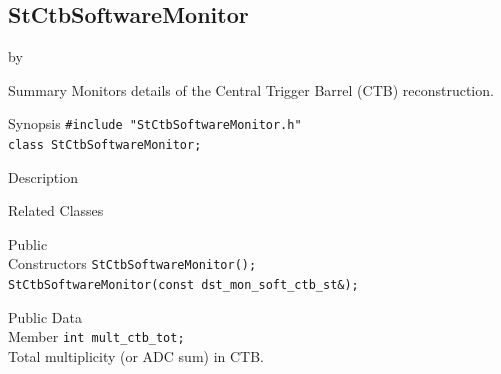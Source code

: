 \documentclass[twoside]{article}
\newcommand{\entrylabel}[1]{\mbox{\textbf{{#1}}}\hfil}%
\newenvironment{entry}
{\begin{list}{}%
    {\renewcommand{\makelabel}{\entrylabel}%
     \setlength{\labelwidth}{90pt}%
     \setlength{\leftmargin}{\labelwidth}
     \advance\leftmargin by \labelsep%
      }%
    }%
  {\end{list}}
\newcommand{\Entrylabel}[1]%
{\raisebox{0pt}[1ex][0pt]{\makebox[\labelwidth][l]%
    {\parbox[t]{\labelwidth}{\hspace{0pt}\textbf{{#1}}}}}}
\newenvironment{Entry}%
{\renewcommand{\entrylabel}{\Entrylabel}\begin{entry}}%
  {\end{entry}}
\begin{document}
\subsection{StCtbSoftwareMonitor}
\label{sec:StCtbSoftwareMonitor}
\begin{Entry}
\item[Summary] Monitors details of the Central Trigger Barrel (CTB)
    reconstruction.
\item[Synopsis]
    \verb+#include "StCtbSoftwareMonitor.h"+\\
    \verb+class StCtbSoftwareMonitor;+\\
\item[Description]
\item[Related Classes]
\item[Public\\ Constructors]
    \verb+StCtbSoftwareMonitor();+\\

    \verb+StCtbSoftwareMonitor(const dst_mon_soft_ctb_st&);+\\
\item[Public Data\\ Member]
    \verb+int mult_ctb_tot;+\\
    Total multiplicity (or ADC sum) in CTB.
\end{Entry}
\clearpage
\end{document}
